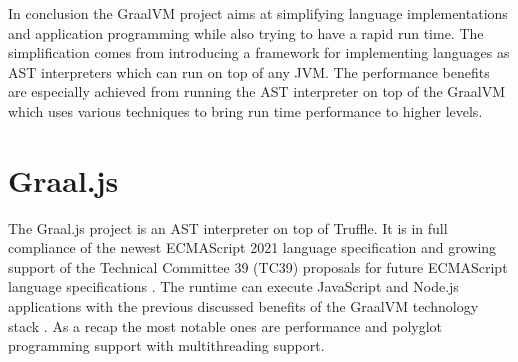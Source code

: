 In conclusion the GraalVM project aims at simplifying language implementations and application programming while also trying to have a rapid run time. The simplification comes from introducing a framework for implementing languages as AST interpreters which can run on top of any JVM. The performance benefits are especially achieved from running the AST interpreter on top of the GraalVM which uses various techniques to bring run time performance to higher levels.
\section{Graal.js}
The Graal.js project is an AST interpreter on top of Truffle. It is in full compliance of the newest ECMAScript 2021 language specification \cite{kangax1, GraaljsComp} and growing support of the Technical Committee 39 (TC39) proposals for future ECMAScript language specifications \cite{kangax2, gitTC}.  The runtime can execute JavaScript and Node.js applications with the previous discussed benefits of the GraalVM technology stack \cite{Graaljs}. As a recap the most notable ones are performance and polyglot programming support with multithreading support.

